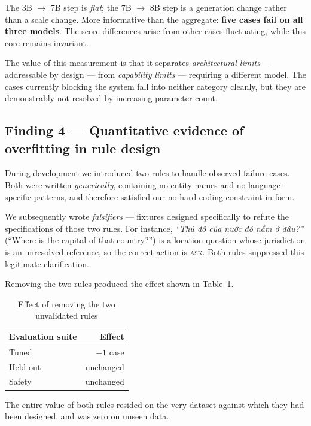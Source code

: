 \documentclass[conference]{IEEEtran}
\newcommand{\ACT}[1]{\textsc{#1}}
\begin{document}
The 3B $\rightarrow$ 7B step is \emph{flat}; the 7B $\rightarrow$ 8B step is a
generation change rather than a scale change. More informative than the aggregate:
\textbf{five cases fail on all three models}. The score differences arise from
other cases fluctuating, while this core remains invariant.

The value of this measurement is that it separates \emph{architectural limits} ---
addressable by design --- from \emph{capability limits} --- requiring a different
model. The cases currently blocking the system fall into neither category
cleanly, but they are demonstrably not resolved by increasing parameter count.

\subsection{Finding 4 --- Quantitative evidence of overfitting in rule design}
\label{sec:finding-overfit}

During development we introduced two rules to handle observed failure cases. Both
were written \emph{generically}, containing no entity names and no
language-specific patterns, and therefore satisfied our no-hard-coding constraint
in form.

We subsequently wrote \emph{falsifiers} --- fixtures designed specifically to
refute the specifications of those two rules. For instance, \emph{``Thủ đô của
nước đó nằm ở đâu?''} (``Where is the capital of that country?'') is a
location question whose jurisdiction is an unresolved reference, so the correct
action is \ACT{ask}. Both rules suppressed this legitimate clarification.

Removing the two rules produced the effect shown in Table~\ref{tab:overfit}.

\begin{table}[t]
\caption{Effect of removing the two unvalidated rules}
\label{tab:overfit}
\centering
\footnotesize
\begin{tabular}{@{}lr@{}}
\toprule
Evaluation suite & Effect \\
\midrule
Tuned    & $-1$ case \\
Held-out & unchanged \\
Safety   & unchanged \\
\bottomrule
\end{tabular}
\end{table}

The entire value of both rules resided on the very dataset against which they had
been designed, and was zero on unseen data.
\end{document}

